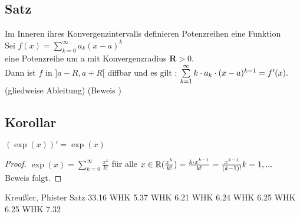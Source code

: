 \subsection[Satz: Potenzreihen und diverenzierbarkeit]{Satz}
Im Inneren ihres Konvergenzintervalls definieren Potenzreihen eine Funktion\\
Sei $f(x) = \sum\limits_{k = 0}^{\infty} a_k (x-a)^k$\\
eine Potenzreihe um a mit Konvergenzradius $\mathbf{R} > 0.$\\
Dann ist $f$ in $]a-R, a+R[$ diffbar und es gilt : $\sum\limits_{k =1}^{\infty} k \cdot a_k \cdot (x-a)^{k-1} = f'(x).$\\
\hfil (gliedweise Ableitung)\newline
\hfil (Beweis \cite{k7})
\subsection{Korollar}
$(\exp(x))' = \exp(x)$
\begin{proof}
$\exp(x) = \sum\limits_{k = 0}^{\infty} \frac{x^k}{k!}$ für alle $x \in \mathbb{R} \\
(\frac{x^k}{k!}) = \frac{k \cdot x^{k-1}}{k!} = \frac{x^{k-1}}{(k-1)!}\\
k = 1, ...$\\
Beweis folgt.
\end{proof}
\begin{thebibliography}{9}
 Kreu\ss ler, Phister Satz 33.16
 WHK 5.37
 WHK 6.21
 WHK 6.24
 WHK 6.25
 WHK 6.25
 WHK 7.32
\end{thebibliography}
